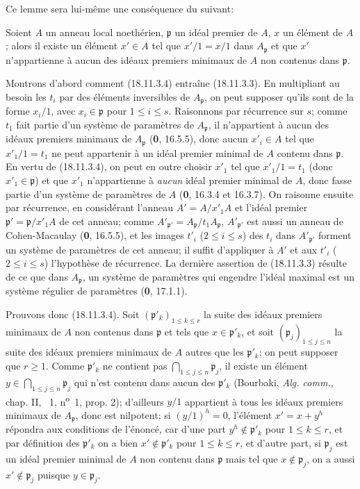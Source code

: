 Ce lemme sera lui-même une conséquence du suivant:

\begin{lemma}[18.11.3.4]
\label{IV.18.11.3.4}
Soient $A$ un anneau local noethérien, $\mathfrak p$ un idéal premier de $A$, $x$ un élément de $A$; alors il existe un élément $x'\in A$ tel que $x'/1=x/1$ dans $A_{\mathfrak p}$ et que $x'$ n'appartienne à aucun des idéaux premiers minimaux de $A$ non contenus dans $\mathfrak p$.
\end{lemma}

Montrons d'abord comment (18.11.3.4) entraîne (18.11.3.3). En multipliant au besoin les $t_i$ par des éléments inversibles de $A_{\mathfrak p}$, on peut supposer qu'ils sont de la forme $x_i/1$, avec $x_i\in\mathfrak p$ pour $1\leq i\leq s$. Raisonnons par récurrence sur $s$; comme $t_1$ fait partie d'un système de paramètres de $A_{\mathfrak p}$, il n'appartient à aucun des idéaux premiers minimaux de $A_{\mathfrak p}$ (\textbf{0}, 16.5.5), donc aucun $x'_i\in A$ tel que $x'_1/1=t_1$ ne peut appartenir à un idéal premier minimal de $A$ contenu dans $\mathfrak p$. En vertu de (18.11.3.4), on peut en outre choisir $x'_1$ tel que $x'_1/1=t_1$ (donc $x'_1\in\mathfrak p$) et que $x'_1$ n'appartienne à \emph{aucun} idéal premier minimal de $A$, donc fasse partie d'un système de paramètres de $A$ (\textbf{0}, 16.3.4 et 16.3.7). On raisonne ensuite par récurrence, en considérant l'anneau $A'=A/x'_1A$ et l'idéal premier $\mathfrak p'=\mathfrak p/x'_1A$ de cet anneau; comme $A'_{\mathfrak p'}=A_{\mathfrak p}/t_1A_{\mathfrak p}$, $A'_{\mathfrak p'}$ est aussi un anneau de Cohen-Macaulay (\textbf{0}, 16.5.5), et les images $t'_i$ ($2\leq i\leq s$) des $t_i$ dans $A'_{\mathfrak p'}$ forment un système de paramètres de cet anneau; il suffit d'appliquer à $A'$ et aux $t'_i$ ($2\leq i\leq s$) l'hypothèse de récurrence. La dernière assertion de (18.11.3.3) résulte de ce que dans $A_{\mathfrak p}$, un système de paramètres qui engendre l'idéal maximal est un système régulier de paramètres (\textbf{0}, 17.1.1).

Prouvons donc (18.11.3.4). Soit $(\mathfrak p'_k)_{1\leq k\leq r}$ la suite des idéaux premiers minimaux de $A$ non contenus dans $\mathfrak p$ et tels que $x\in\mathfrak p'_k$, et soit $(\mathfrak p_j)_{1\leq j\leq n}$ la suite des idéaux premiers minimaux de $A$ autres que les $\mathfrak p'_k$; on peut supposer que $r\geq1$. Comme $\mathfrak p'_k$ ne contient pas $\bigcap_{1\leq j\leq n}\mathfrak p_j$, il existe un élément $y\in\bigcap_{1\leq j\leq n}\mathfrak p_j$ qui n'est contenu dans aucun des $\mathfrak p'_k$ (Bourbaki, \emph{Alg. comm.}, chap. II, \textsection~1, n\textsuperscript{o}~1, prop. 2); d'ailleurs $y/1$ appartient à tous les idéaux premiers minimaux de $A_{\mathfrak p}$, donc est nilpotent; si $(y/1)^h=0$, l'élément $x'=x+y^h$ répondra aux conditions de l'énoncé, car d'une part $y^h\notin\mathfrak p'_k$ pour $1\leq k\leq r$, et par définition des $\mathfrak p'_k$ on a bien $x'\notin\mathfrak p'_k$ pour $1\leq k\leq r$, et d'autre part, si $\mathfrak p_j$ est un idéal premier minimal de $A$ non contenu dans $\mathfrak p$ mais tel que $x\notin\mathfrak p_j$, on a aussi $x'\notin\mathfrak p_j$ puisque $y\in\mathfrak p_j$.

